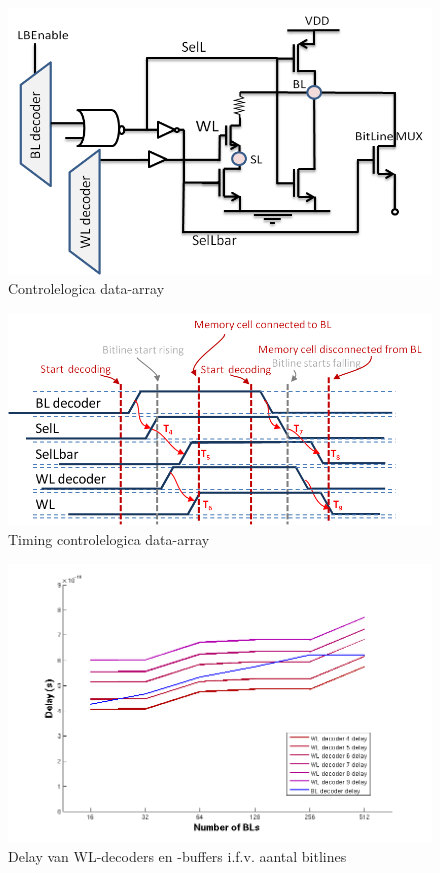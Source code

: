\begin{figure}[!ht]
  \centering
  \includegraphics[scale=0.6]{../fig/hfdstk-timing-lbcell1.png}
  \caption[Data-array:logica]{Controlelogica data-array}
  \label{fig:lbcell_timing1}
\end{figure}

\begin{figure}[!ht]
  \centering
  \includegraphics[scale=0.9]{../fig/hfdstk-timing-lbcell2.png}
  \caption[Data-array:timing]{Timing controlelogica data-array}
  \label{fig:lbcell_timing2}
\end{figure}

\begin{figure}[!ht]
  \centering
  \includegraphics[scale=0.6]{../fig/hfdstk-timing-decoder-dep.png}
  \caption[Delay van WL-decoders en -buffers i.f.v. BL-decoders]{Delay van WL-decoders en -buffers i.f.v. aantal bitlines}
  \label{fig:decoder_dep}
\end{figure}

